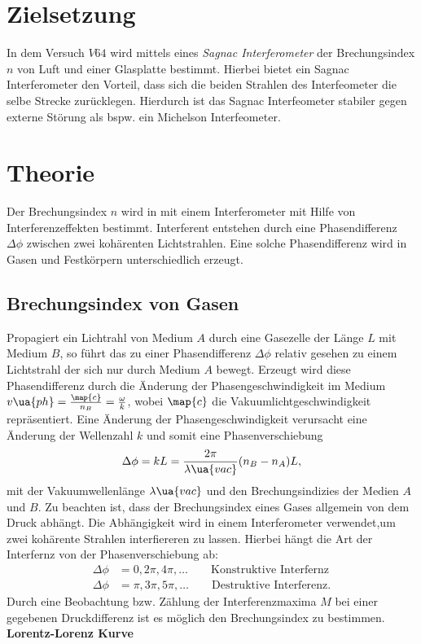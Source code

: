 \setcounter{page}{1}
\section*{Zielsetzung}
In dem Versuch $V64$ wird mittels eines \emph{Sagnac Interferometer}
der Brechungsindex $n$ von Luft und einer Glasplatte bestimmt.
Hierbei bietet ein Sagnac Interferometer den Vorteil, dass sich
die beiden Strahlen des Interfeometer die selbe Strecke zurücklegen.
Hierdurch ist das Sagnac Interfeometer stabiler gegen externe Störung
als bspw. ein Michelson Interfeometer.

\section{Theorie}
Der Brechungsindex $n$ wird in mit einem Interferometer mit Hilfe von
Interferenzeffekten bestimmt. Interferent entstehen durch
eine Phasendifferenz $\Delta\phi$ zwischen zwei kohärenten Lichtstrahlen.
Eine solche Phasendifferenz wird in Gasen und Festkörpern unterschiedlich erzeugt.

\subsection{Brechungsindex von Gasen}
Propagiert ein Lichtrahl von Medium $A$ durch eine Gasezelle der Länge $L$ mit Medium $B$,
so führt das zu einer Phasendifferenz $\Delta\phi$ relativ gesehen zu einem Lichtstrahl der sich
nur durch Medium $A$ bewegt. Erzeugt wird diese Phasendifferenz durch die Änderung der
Phasengeschwindigkeit im Medium $v\ua{ph}=\frac{\map{c}}{n_B}=\frac{\omega}{k}$, wobei $\map{c}$
die Vakuumlichtgeschwindigkeit repräsentiert. Eine Änderung der Phasengeschwindigkeit
verursacht eine Änderung der Wellenzahl $k$ und somit eine Phasenverschiebung
\begin{equation}
  \label{eq:phase_shit_gases}
\Delta\phi = kL = \frac{2\pi}{\lambda\ua{vac}}(n_B-n_A)L,
\end{equation}
mit der Vakuumwellenlänge $\lambda\ua{vac}$ und den Brechungsindizies der
Medien $A$ und $B$.
Zu beachten ist, dass der Brechungsindex eines Gases allgemein von dem Druck abhängt.
Die Abhängigkeit wird in einem Interferometer verwendet,um zwei kohärente Strahlen
interfiereren zu lassen. Hierbei hängt die Art der Interfernz von der Phasenverschiebung ab:
\begin{align}
  \Delta\phi &=0,2\pi,4\pi,\dots \qquad \text{Konstruktive Interfernz} \label{eq:Konstruktive}\\
  \Delta\phi &= \pi, 3\pi, 5\pi,\dots \qquad \text{Destruktive Interferenz}. \label{eq:Destruktive}
\end{align}
Durch eine Beobachtung bzw. Zählung der Interferenzmaxima $M$ bei einer gegebenen Druckdifferenz
ist es möglich den Brechungsindex zu bestimmen.
\textbf{Lorentz-Lorenz Kurve}


